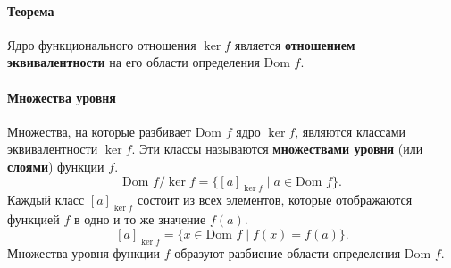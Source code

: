 \paragraph{Теорема}
Ядро функционального отношения $\ker f$ является \textbf{отношением эквивалентности} на его области определения $\text{Dom } f$.

\paragraph{Множества уровня}
Множества, на которые разбивает $\text{Dom } f$ ядро $\ker f$, являются классами эквивалентности $\ker f$. Эти классы называются \textbf{множествами уровня} (или \textbf{слоями}) функции $f$.
$$\text{Dom } f / \ker f = \{[a]_{\ker f} \mid a \in \text{Dom } f\}.$$
Каждый класс $[a]_{\ker f}$ состоит из всех элементов, которые отображаются функцией $f$ в одно и то же значение $f(a)$.
$$[a]_{\ker f} = \{x \in \text{Dom } f \mid f(x) = f(a)\}.$$
Множества уровня функции $f$ образуют разбиение области определения $\text{Dom } f$.